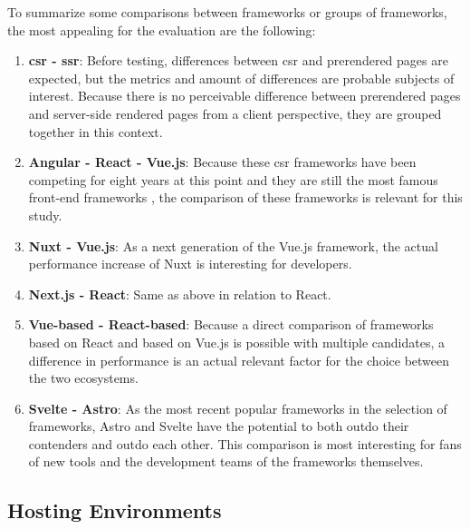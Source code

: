 \documentclass[a4paper, 12pt]{article}
\begin{document}
To summarize some comparisons between frameworks or groups of frameworks, the most appealing for the evaluation are the following:

\begin{enumerate}
  \item \textbf{\acrshort{csr} - \acrshort{ssr}}: Before testing, differences between \acrshort{csr} and prerendered pages are expected, but the metrics and amount of differences are probable subjects of interest.
  Because there is no perceivable difference between prerendered pages and server-side rendered pages from a client perspective, they are grouped together in this context.
  \item \textbf{Angular - React - Vue.js}: Because these \acrshort{csr} frameworks have been competing for eight years at this point and they are still the most famous front-end frameworks \citep{stateOfJs2023}, the comparison of these frameworks is relevant for this study.
  \item \textbf{Nuxt - Vue.js}: As a next generation of the Vue.js framework, the actual performance increase of Nuxt is interesting for developers.
  \item \textbf{Next.js - React}: Same as above in relation to React.
  \item \textbf{Vue-based - React-based}: Because a direct comparison of frameworks based on React and based on Vue.js is possible with multiple candidates, a difference in performance is an actual relevant factor for the choice between the two ecosystems.
  \item \textbf{Svelte - Astro}: As the most recent popular frameworks in the selection of frameworks, Astro and Svelte have the potential to both outdo their contenders and outdo each other.
  This comparison is most interesting for fans of new tools and the development teams of the frameworks themselves.
\end{enumerate}


\subsection{Hosting Environments}\label{subsec:hostingenvironments}
% 
% 
\end{document}
